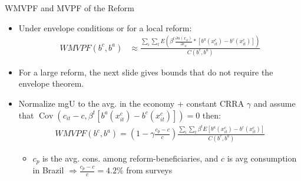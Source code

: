 \begin{frame}[label=wmvpfMvpf]{WMVPF and MVPF of the Reform}
    \begin{itemize}
        \item Under envelope conditions or for a local reform:
        \begin{align*}
            WMVPF(b^c,b^a)&\approx \frac{\sum_i \sum_t E\left(\beta^t \frac{\partial u(x_{it})}{\partial c_{it}}*[b^a(x_{it}^c)-b^c(x_{it}^c)]\right)}{C(b^c,b^a)}
        \end{align*}
        \item For a large reform, the next slide gives bounds that do not require the envelope theorem.
        \item Normalize mgU to the avg. in the economy + constant CRRA $\gamma$ and assume that \(\operatorname{Cov}\left(
c_{it}-c,
\beta^t\left[b^a(x^c_{it})-b^c(x^c_{it})\right]
\right)=0\) then:
        \begin{align*}
            WMVPF(b^c,b^a) = \left(1-\gamma\frac{c_{p}-c}{c}\right)\frac{\sum_i \sum_t  \beta^{t}E[b^a(x_{it}^c)-b^c(x_{it}^c)]}{C(b^c,b^a)}
        \end{align*}
        \begin{itemize}
            \item $c_p$ is the avg. cons. among reform-beneficiaries, and $c$ is avg consumption in Brazil $\Rightarrow \frac{c_{p}-c}{c}=4.2\%$ from surveys
        \end{itemize}
    \end{itemize}
\end{frame}


